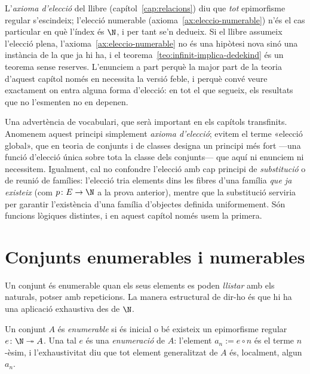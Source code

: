\begin{observacio}\label{obs:eleccio-global-vs-numerable}
L'\emph{axioma d'elecció} del llibre (capítol~\ref{cap:relacions}) diu que
\emph{tot} epimorfisme regular s'escindeix; l'elecció numerable
(axioma~\ref{ax:eleccio-numerable}) n'és el cas particular en què l'índex
és \(\N\), i per tant se'n dedueix. Si el llibre assumeix l'elecció plena,
l'axioma~\ref{ax:eleccio-numerable} no és una hipòtesi nova sinó una
instància de la que ja hi ha, i el
teorema~\ref{teo:infinit-implica-dedekind} és un teorema sense reserves.
L'enunciem a part perquè la major part de la teoria d'aquest capítol només
en necessita la versió feble, i perquè convé veure exactament on entra
alguna forma d'elecció: en tot el que segueix, els resultats que no
l'esmenten no en depenen.

Una advertència de vocabulari, que serà important en els capítols
transfinits. Anomenem aquest principi simplement \emph{axioma d'elecció};
evitem el terme «elecció global», que en teoria de conjunts i de classes
designa un principi més fort ---una funció d'elecció única sobre tota la
classe dels conjunts--- que aquí ni enunciem ni necessitem. Igualment, cal
no confondre l'elecció amb cap principi de \emph{substitució} o de reunió de
famílies: l'elecció tria elements dins les fibres d'una família \emph{que ja
existeix} (com \(p\colon E\to\N\) a la prova anterior), mentre que la
substitució serviria per garantir l'existència d'una família d'objectes
definida uniformement. Són funcions lògiques distintes, i en aquest capítol
només usem la primera.
\end{observacio}

\section{Conjunts enumerables i numerables}\label{sec:enumerables}

Un conjunt és enumerable quan els seus elements es poden \emph{llistar}
amb els naturals, potser amb repeticions. La manera estructural de dir-ho
és que hi ha una aplicació exhaustiva des de \(\N\).

\begin{definicio}\label{def:enumerable}
Un conjunt \(A\) és \emph{enumerable} si és inicial o bé existeix un
epimorfisme regular \(e\colon\N\twoheadrightarrow A\). Una tal \(e\) és una
\emph{enumeració} de \(A\): l'element \(a_n:=e\circ n\) és el terme
\(n\)-èsim, i l'exhaustivitat diu que tot element generalitzat de \(A\)
és, localment, algun \(a_n\).
\end{definicio}


